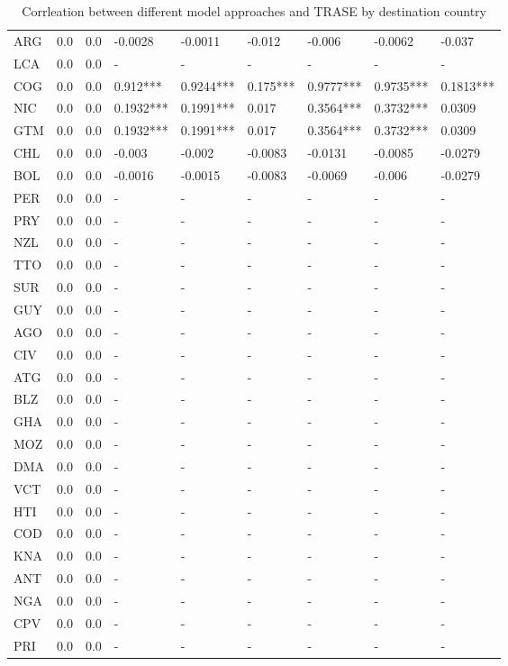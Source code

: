 \begin{table}[ht]
\begin{tabular}{lrrllllll}
  ARG & 0.0 & 0.0 & -0.0028  & -0.0011  & -0.012  & -0.006  & -0.0062  & -0.037  \\ 
  LCA & 0.0 & 0.0 & - & - & - & - & - & - \\ 
  COG & 0.0 & 0.0 & 0.912*** & 0.9244*** & 0.175*** & 0.9777*** & 0.9735*** & 0.1813*** \\ 
  NIC & 0.0 & 0.0 & 0.1932*** & 0.1991*** & 0.017  & 0.3564*** & 0.3732*** & 0.0309  \\ 
  GTM & 0.0 & 0.0 & 0.1932*** & 0.1991*** & 0.017  & 0.3564*** & 0.3732*** & 0.0309  \\ 
  CHL & 0.0 & 0.0 & -0.003  & -0.002  & -0.0083  & -0.0131  & -0.0085  & -0.0279  \\ 
  BOL & 0.0 & 0.0 & -0.0016  & -0.0015  & -0.0083  & -0.0069  & -0.006  & -0.0279  \\ 
  PER & 0.0 & 0.0 & - & - & - & - & - & - \\ 
  PRY & 0.0 & 0.0 & - & - & - & - & - & - \\ 
  NZL & 0.0 & 0.0 & - & - & - & - & - & - \\ 
  TTO & 0.0 & 0.0 & - & - & - & - & - & - \\ 
  SUR & 0.0 & 0.0 & - & - & - & - & - & - \\ 
  GUY & 0.0 & 0.0 & - & - & - & - & - & - \\ 
  AGO & 0.0 & 0.0 & - & - & - & - & - & - \\ 
  CIV & 0.0 & 0.0 & - & - & - & - & - & - \\ 
  ATG & 0.0 & 0.0 & - & - & - & - & - & - \\ 
  BLZ & 0.0 & 0.0 & - & - & - & - & - & - \\ 
  GHA & 0.0 & 0.0 & - & - & - & - & - & - \\ 
  MOZ & 0.0 & 0.0 & - & - & - & - & - & - \\ 
  DMA & 0.0 & 0.0 & - & - & - & - & - & - \\ 
  VCT & 0.0 & 0.0 & - & - & - & - & - & - \\ 
  HTI & 0.0 & 0.0 & - & - & - & - & - & - \\ 
  COD & 0.0 & 0.0 & - & - & - & - & - & - \\ 
  KNA & 0.0 & 0.0 & - & - & - & - & - & - \\ 
  ANT & 0.0 & 0.0 & - & - & - & - & - & - \\ 
  NGA & 0.0 & 0.0 & - & - & - & - & - & - \\ 
  CPV & 0.0 & 0.0 & - & - & - & - & - & - \\ 
  PRI & 0.0 & 0.0 & - & - & - & - & - & - \\ 
   \hline
\end{tabular}
\caption{Corrleation between different model approaches and TRASE by destination country} 
\end{table}
